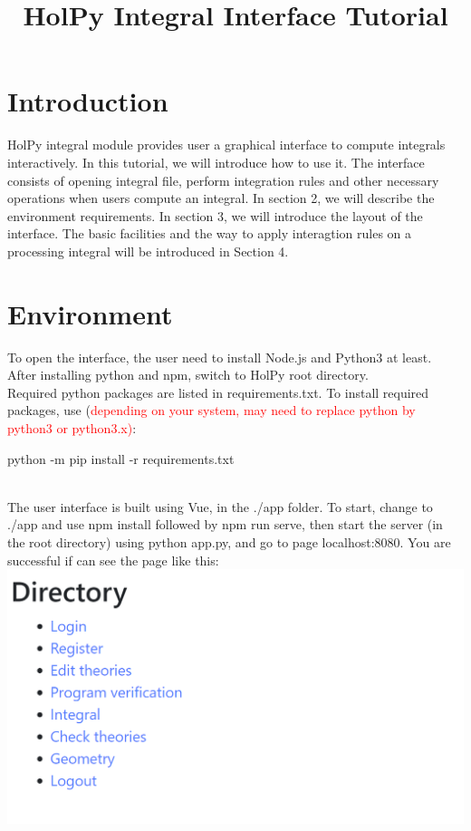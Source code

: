 \documentclass[titlepage]{article}
\title{HolPy Integral Interface Tutorial}
\begin{document}
\maketitle
\tableofcontents
\section{Introduction}
HolPy integral module provides user a graphical interface to compute integrals interactively. In this tutorial, we will introduce how to use it. The interface consists of opening integral file, perform integration rules and other necessary operations when users compute an integral. In section 2, we will describe the environment requirements. In section 3, we will introduce the layout of the interface. The basic facilities and the way to apply interagtion rules on a processing integral will be introduced in Section 4.
\section{Environment}
To open the interface, the user need to install Node.js and Python3 at least. \\
After installing python and npm, switch to HolPy root directory.\\
Required python packages are listed in requirements.txt. To install required packages, use (\textcolor{red}{depending on your system, may need to replace python by python3 or python3.x)}:\\
\centerline{\colorbox{mygray}{\small{python -m pip install -r requirements.txt}}}\\
The user interface is built using Vue, in the ./app folder. To start, change to ./app and use \colorbox{mygray}{npm install} followed by \colorbox{mygray}{npm run serve}, then start the server (in the root directory) using \colorbox{mygray}{python app.py}, and go to page \colorbox{mygray}{localhost:8080}. You are successful if can see the page like this:\\
\includegraphics[bb=0 0 300 200]{1.png}\\
\end{document}
